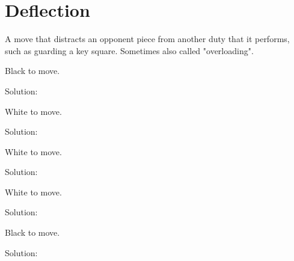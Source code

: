 \documentclass{book}
\begin{document}
\section{Deflection}
A move that distracts an opponent piece from another duty that it performs, such as guarding a key square. Sometimes also called "overloading".\begin{multicols}{2} 
\begin{samepage} 
\newgame 


 
\showboard
 
 Black to move. 
 
Solution: 
 
\end{samepage}\begin{samepage} 
\newgame 


 
\showboard
 
 White to move. 
 
Solution: 
 
\end{samepage}\begin{samepage} 
\newgame 


 
\showboard
 
 White to move. 
 
Solution: 
 
\end{samepage}\begin{samepage} 
\newgame 


 
\showboard
 
 White to move. 
 
Solution: 
 
\end{samepage}\begin{samepage} 
\newgame 


 
\showboard
 
 Black to move. 
 
Solution: 
 

\end{samepage}
\end{multicols}
\end{document}
